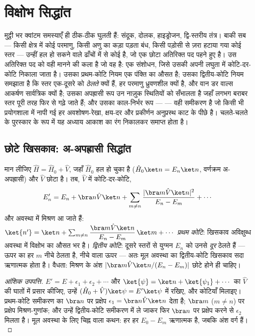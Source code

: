\chapter{विक्षोभ सिद्धांत}\label{ch:b3:perturbation-theory}

मुट्ठी भर क्वांटम समस्याएँ ही ठीक-ठीक घुलती हैं: संदूक,
दोलक, हाइड्रोजन, द्वि-स्तरीय तंत्र। बाकी सब --- किसी क्षेत्र में कोई
परमाणु, किसी अणु का कड़ा पड़ता बंध, किसी पड़ोसी से ज़रा हटाया गया कोई
स्तर --- उन्हीं हल हो सकने वाले ढाँचों में से कोई है, जो एक छोटा
अतिरिक्त पद पहने हुए है।  उस अतिरिक्त पद को वही मानने
की कला है जो वह है: एक संशोधन, जिसे उसकी अपनी लघुता में
कोटि-दर-कोटि निकाला जाता है। उसका प्रथम-कोटि नियम एक पंक्ति का औसत है;
उसका द्वितीय-कोटि नियम समझाता है कि स्तर एक-दूसरे को \emph{ठेलते} क्यों
हैं, हर परमाणु ध्रुवणशील क्यों है, और वान डर वाल्स आकर्षण सार्वत्रिक
क्यों है; उसका अपह्रासी रूप उन नाज़ुक स्थितियों को सँभालता है जहाँ लगभग
बराबर स्तर पूरी तरह फिर से गढ़े जाते हैं; और उसका काल-निर्भर रूप ---
 --- वही समीकरण है जो किसी भी प्रयोगशाला में नापी
गई हर अवशोषण-रेखा, क्षय-दर और प्रकीर्णन अनुप्रस्थ काट के पीछे है।
चलते-चलते के पुरस्कार के रूप में यह अध्याय आकाश का रंग निकालकर समाप्त होता है।

\section{छोटे खिसकाव: अ-अपह्रासी सिद्धांत}

\begin{theorem}[विक्षोभी संशोधन]\label{thm:b3:perturbation-theory:corrections}
मान लीजिए $\hat H = \hat H_0 + \hat V$, जहाँ $\hat H_0$ हल हो चुका है
($\hat H_0\ket n = E_n\ket n$, वर्णक्रम अ-अपह्रासी) और $\hat V$
छोटा है। तब, $\hat V$ में कोटि-दर-कोटि,
\[
E_n' = E_n + \bra n\hat V\ket n
 + \sum_{m \neq n}\frac{|\bra m\hat V\ket n|^2}{E_n - E_m}
 + \cdots
\]
और अवस्था में मिश्रण आ जाते हैं: $\ket{n'} = \ket n + \sum_{m\neq
n}\dfrac{\bra m\hat V\ket n}{E_n - E_m}\,\ket m + \cdots$
\emph{प्रथम कोटि}: खिसकाव अविक्षुब्ध अवस्था में विक्षोभ का
औसत भर है। \emph{द्वितीय कोटि}:
दूसरे स्तरों से युग्मन $E_n$ को उनसे \emph{दूर} ठेलते हैं ---
ऊपर का हर $m$ नीचे ठेलता है, नीचे वाला ऊपर --- अतः मूल
अवस्था का द्वितीय-कोटि खिसकाव सदा ऋणात्मक होता है। वैधता: मिश्रण के
अंश $|\bra m\hat V\ket n/(E_n - E_m)|$ छोटे होने ही चाहिए।
\end{theorem}

\begin{proof}[आंशिक उपपत्ति]
$E' = E + \epsilon_1 + \epsilon_2 + \cdots$ और $\ket{\psi} =
\ket n + \ket{\psi_1} + \cdots$ का $\hat V$ की घातों में प्रसार कीजिए,
उन्हें $(\hat H_0 + \hat V)\ket\psi = E'\ket\psi$ में रखिए, और कोटियाँ
मिलाइए। प्रथम-कोटि समीकरण का $\bra n$ पर प्रक्षेप $\epsilon_1 =
\bra n\hat V\ket n$ देता है; $\bra m$ ($m \neq n$) पर प्रक्षेप
मिश्रण-गुणांक; और उन्हें द्वितीय-कोटि
समीकरण में ले जाकर फिर $\bra n$ पर प्रक्षेप करने से $\epsilon_2$ मिलता
है। मूल अवस्था के लिए चिह्न वाला कथन: हर हर $E_0 - E_m$
ऋणात्मक है, जबकि अंश वर्ग हैं।
\end{proof}

